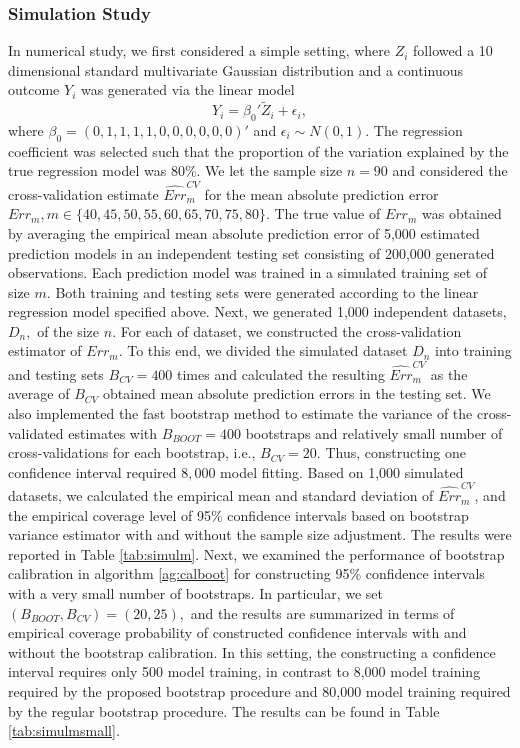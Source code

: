 \documentclass[12pt]{article}
\begin{document}
\subsubsection{Simulation Study}

In numerical study,  we first considered a simple setting, where $Z_i$ followed a 10 dimensional standard multivariate Gaussian distribution and a continuous outcome $Y_i$ was generated via the linear model 
$$Y_i=\beta_0'\tilde{Z}_i+\epsilon_i,$$
where $\beta_0=(0, 1, 1, 1, 1, 0, 0, 0, 0, 0, 0)'$ and $\epsilon_i\sim N(0, 1).$ The regression coefficient was selected such that the proportion of the variation explained by the true regression model was 80\%. We let the sample size $n=90$ and considered the cross-validation estimate $\widehat{Err}_m^{CV}$ for the mean absolute prediction error $Err_m, m\in\{40,45,50, 55, 60, 65, 70, 75, 80\}.$ The true value of $Err_m$ was obtained by averaging the empirical mean absolute prediction error of 5,000 estimated prediction models in an independent testing set consisting of 200,000 generated observations. Each prediction model was trained in  a simulated training set of size $m.$ Both training and testing sets were generated according to the linear regression model specified above.  Next, we generated 1,000 independent datasets, $D_n,$ of the size $n.$ For each of dataset, we constructed the cross-validation estimator of $Err_m$.  To this end, we divided the simulated dataset $D_n$ into training and testing sets $B_{CV}=400$ times and calculated the resulting $\widehat{Err}_m^{CV}$ as the average of $B_{CV}$ obtained mean absolute prediction errors in the testing set.  We also implemented the fast bootstrap method to estimate the variance of the cross-validated estimates with $B_{BOOT}=400$ bootstraps and relatively small number of cross-validations for each bootstrap, i.e., $B_{CV}=20$. Thus, constructing one confidence interval required $8,000$ model fitting.  Based on 1,000 simulated datasets, we calculated the empirical mean and standard deviation of $\widehat{Err}_m^{CV}$, and the empirical coverage level of 95\% confidence intervals based on bootstrap variance estimator with and without the sample size adjustment. The results were reported in Table \ref{tab:simulm}.  Next, we examined the performance of bootstrap calibration in algorithm \ref{ag:calboot} for constructing 95\% confidence intervals with a very small number of bootstraps. In particular, we set $(B_{BOOT}, B_{CV})=(20, 25),$ and the results are summarized in terms of empirical coverage probability of constructed confidence intervals with and without the bootstrap calibration. In this setting, the constructing a confidence interval requires only 500 model training, in contrast to 8,000 model training required by the proposed bootstrap procedure and 80,000 model training required by the regular bootstrap procedure. The results can be found in Table \ref{tab:simulmsmall}.
\end{document}

